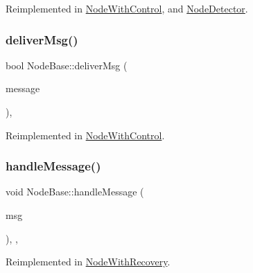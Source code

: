 Reimplemented in \hyperlink{classNodeWithControl_a7772568c2836f5f204952ebe659e0049}{Node\+With\+Control}, and \hyperlink{classNodeDetector_a7100349647350ad5e3aeb1ed4669c723}{Node\+Detector}.

\mbox{\label{classNodeBase_a49052382add1123da26db6bfb687d254}} 
\subsubsection{\texorpdfstring{deliver\+Msg()}{deliverMsg()}}
{\footnotesize\ttfamily bool Node\+Base\+::deliver\+Msg (\begin{DoxyParamCaption}\item[{const \hyperlink{structures_8h_a7e7bdc1d2fff8a9436f2f352b2711ed6}{message\+Info} \&}]{message }\end{DoxyParamCaption})\hspace{0.3cm}{\ttfamily [protected]}, {\ttfamily [virtual]}}



Reimplemented in \hyperlink{classNodeWithControl_aada7451be61be592b27188b6249afef2}{Node\+With\+Control}.

\mbox{\label{classNodeBase_add2450264be5dd616f9f9ac94e83b988}} 
\subsubsection{\texorpdfstring{handle\+Message()}{handleMessage()}}
{\footnotesize\ttfamily void Node\+Base\+::handle\+Message (\begin{DoxyParamCaption}\item[{c\+Message $\ast$}]{msg }\end{DoxyParamCaption})\hspace{0.3cm}{\ttfamily [override]}, {\ttfamily [protected]}, {\ttfamily [virtual]}}



Reimplemented in \hyperlink{classNodeWithRecovery_a901c89606b84898e13fe8a66228acd9f}{Node\+With\+Recovery}.

\mbox{\label{classNodeBase_af7910c39553111295b66c88742d1198a}} 
